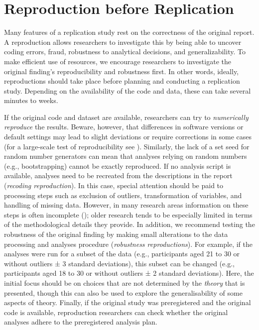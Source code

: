 \documentclass[
  letterpaper,
  DIV=11,
  openany,
  fontsize=12pt,
  parskip=half,
  headings=big,
  numbers=noenddot,
  titlepage=false]{scrreprt}
\begin{document}
\section{Reproduction before
Replication}\label{reproduction-before-replication}

Many features of a replication study rest on the correctness of the
original report. A reproduction allows researchers to investigate this
by being able to uncover coding errors, fraud, robustness to analytical
decisions, and generalizability. To make efficient use of resources, we
encourage researchers to investigate the original finding's
reproducibility and robustness first. In other words, ideally,
reproductions should take place before planning and conducting a
replication study. Depending on the availability of the code and data,
these can take several minutes to weeks.

If the original code and dataset are available, researchers can try to
\emph{numerically reproduce} the results. Beware, however, that
differences in software versions or default settings may lead to slight
deviations or require corrections in some cases (for a large-scale test
of reproducibility see ). Similarly, the lack of a set seed for random number
generators can mean that analyses relying on random numbers (e.g.,
bootstrapping) cannot be exactly reproduced. If no analysis script is
available, analyses need to be recreated from the descriptions in the
report (\emph{recoding reproduction}). In this case, special attention
should be paid to processing steps such as exclusion of outliers,
transformation of variables, and handling of missing data. However, in
many research areas information on these steps is often incomplete
(); older research tends
to be especially limited in terms of the methodological details they
provide. In addition, we recommend testing the robustness of the
original finding by making small alterations to the data processing and
analyses procedure (\emph{robustness reproductions}). For example, if
the analyses were run for a subset of the data (e.g., participants aged
21 to 30 or without outliers ± 3 standard deviations), this subset can
be changed (e.g., participants aged 18 to 30 or without outliers ± 2
standard deviations). Here, the initial focus should be on choices that
are not determined by the \emph{theory }that is presented, though this
can also be used to explore the generalisability of some aspects of
theory. Finally, if the original study was preregistered and the
original code is available, reproduction researchers can check whether
the original analyses adhere to the preregistered analysis plan.
\end{document}
